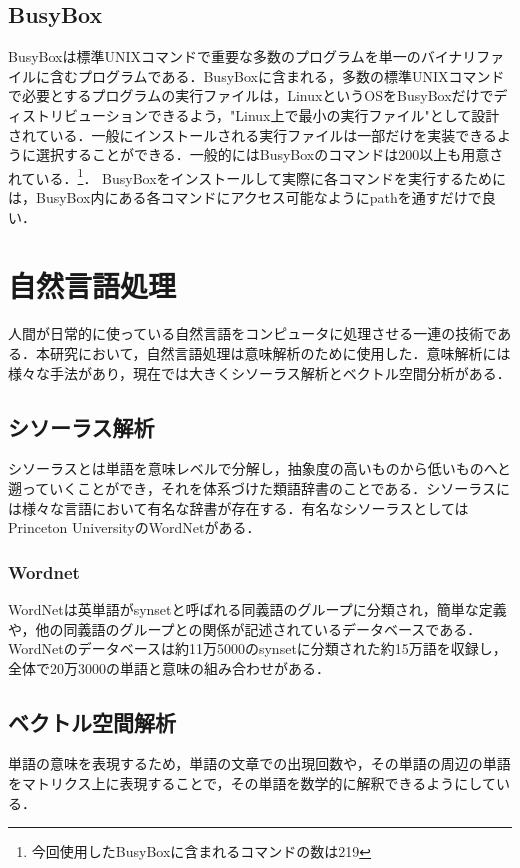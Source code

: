 \subsection{BusyBox}
\label{tech:BusyBox}
BusyBoxは標準UNIXコマンドで重要な多数のプログラムを単一のバイナリファイルに含むプログラムである．BusyBoxに含まれる，多数の標準UNIXコマンドで必要とするプログラムの実行ファイルは，LinuxというOSをBusyBoxだけでディストリビューションできるよう，"Linux上で最小の実行ファイル"として設計されている．一般にインストールされる実行ファイルは一部だけを実装できるように選択することができる．一般的にはBusyBoxのコマンドは200以上も用意されている．\cite{busybox}\footnote{今回使用したBusyBoxに含まれるコマンドの数は219}．
BusyBoxをインストールして実際に各コマンドを実行するためには，BusyBox内にある各コマンドにアクセス可能なようにpathを通すだけで良い．

\section{自然言語処理}
\label{tech:NLP}
人間が日常的に使っている自然言語をコンピュータに処理させる一連の技術である．本研究において，自然言語処理は意味解析のために使用した．意味解析には様々な手法があり，現在では大きくシソーラス解析とベクトル空間分析がある．

\subsection{シソーラス解析}
\label{tech:Siso}
シソーラスとは単語を意味レベルで分解し，抽象度の高いものから低いものへと遡っていくことができ，それを体系づけた類語辞書のことである．シソーラスには様々な言語において有名な辞書が存在する．有名なシソーラスとしてはPrinceton UniversityのWordNetがある．\cite{wordnet}

\subsubsection{Wordnet}
\label{tech:Wordnet}
WordNetは英単語がsynsetと呼ばれる同義語のグループに分類され，簡単な定義や，他の同義語のグループとの関係が記述されているデータベースである．WordNetのデータベースは約11万5000のsynsetに分類された約15万語を収録し，全体で20万3000の単語と意味の組み合わせがある．\cite{wordnetwiki}

\subsection{ベクトル空間解析}
\label{tech:Vector}
単語の意味を表現するため，単語の文章での出現回数や，その単語の周辺の単語をマトリクス上に表現することで，その単語を数学的に解釈できるようにしている．


